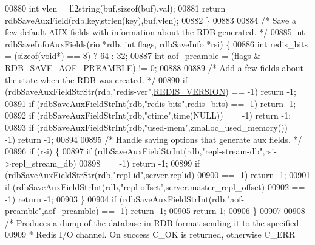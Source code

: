 \begin{DoxyCode}
{{{{{{{{00880     \textcolor{keywordtype}{int} vlen = ll2string(buf,\textcolor{keyword}{sizeof}(buf),val);
00881     \textcolor{keywordflow}{return} rdbSaveAuxField(rdb,key,strlen(key),buf,vlen);
00882 \}
00883 
00884 \textcolor{comment}{/* Save a few default AUX fields with information about the RDB generated. */}
00885 \textcolor{keywordtype}{int} rdbSaveInfoAuxFields(rio *rdb, \textcolor{keywordtype}{int} flags, rdbSaveInfo *rsi) \{
00886     \textcolor{keywordtype}{int} redis\_bits = (\textcolor{keyword}{sizeof}(\textcolor{keywordtype}{void}*) == 8) ? 64 : 32;
00887     \textcolor{keywordtype}{int} aof\_preamble = (flags & \hyperlink{rdb_8h_a0bafda4fc4a08ebf980ba8e2a1bd3b78}{RDB\_SAVE\_AOF\_PREAMBLE}) != 0;
00888 
00889     \textcolor{comment}{/* Add a few fields about the state when the RDB was created. */}
00890     \textcolor{keywordflow}{if} (rdbSaveAuxFieldStrStr(rdb,\textcolor{stringliteral}{"redis-ver"},\hyperlink{version_8h_a357a0d302ef7fbb42bf2db0632b9f7fe}{REDIS\_VERSION}) == -1) \textcolor{keywordflow}{return} -1;
00891     \textcolor{keywordflow}{if} (rdbSaveAuxFieldStrInt(rdb,\textcolor{stringliteral}{"redis-bits"},redis\_bits) == -1) \textcolor{keywordflow}{return} -1;
00892     \textcolor{keywordflow}{if} (rdbSaveAuxFieldStrInt(rdb,\textcolor{stringliteral}{"ctime"},time(NULL)) == -1) \textcolor{keywordflow}{return} -1;
00893     \textcolor{keywordflow}{if} (rdbSaveAuxFieldStrInt(rdb,\textcolor{stringliteral}{"used-mem"},zmalloc\_used\_memory()) == -1) \textcolor{keywordflow}{return} -1;
00894 
00895     \textcolor{comment}{/* Handle saving options that generate aux fields. */}
00896     \textcolor{keywordflow}{if} (rsi) \{
00897         \textcolor{keywordflow}{if} (rdbSaveAuxFieldStrInt(rdb,\textcolor{stringliteral}{"repl-stream-db"},rsi->repl\_stream\_db)
00898             == -1) \textcolor{keywordflow}{return} -1;
00899         \textcolor{keywordflow}{if} (rdbSaveAuxFieldStrStr(rdb,\textcolor{stringliteral}{"repl-id"},server.replid)
00900             == -1) \textcolor{keywordflow}{return} -1;
00901         \textcolor{keywordflow}{if} (rdbSaveAuxFieldStrInt(rdb,\textcolor{stringliteral}{"repl-offset"},server.master\_repl\_offset)
00902             == -1) \textcolor{keywordflow}{return} -1;
00903     \}
00904     \textcolor{keywordflow}{if} (rdbSaveAuxFieldStrInt(rdb,\textcolor{stringliteral}{"aof-preamble"},aof\_preamble) == -1) \textcolor{keywordflow}{return} -1;
00905     \textcolor{keywordflow}{return} 1;
00906 \}
00907 
00908 \textcolor{comment}{/* Produces a dump of the database in RDB format sending it to the specified}
00909 \textcolor{comment}{ * Redis I/O channel. On success C\_OK is returned, otherwise C\_ERR}
}}}}}}}}
\end{DoxyCode}
